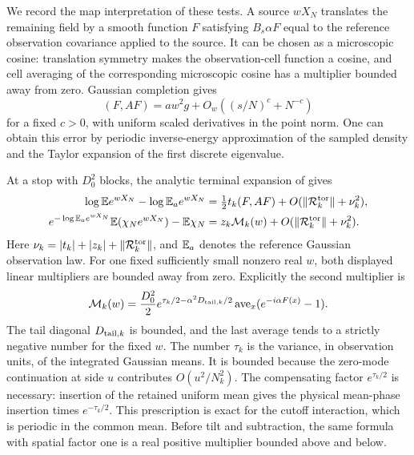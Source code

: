 We record the map interpretation of these tests.  A source $wX_N$
translates the remaining field by a smooth function $F$ satisfying
$B_s\alpha F$ equal to the reference observation covariance applied
to the source.  It can be chosen as a microscopic cosine: translation
symmetry makes the observation-cell function a cosine, and cell
averaging of the corresponding microscopic cosine has a multiplier
bounded away from zero.  Gaussian completion gives
\begin{equation}\label{eq:bulk-F-energy}
 (F,AF)=aw^2g+O_w((s/N)^c+N^{-c})
\end{equation}
for a fixed $c>0$, with uniform scaled derivatives in the point
norm.  One can obtain this error by periodic inverse-energy
approximation of the sampled density and the Taylor expansion of
the first discrete eigenvalue.

At a stop with $D_0^2$ blocks, the analytic terminal expansion of
\cite[Equations (10.3) and
(10.4)]{B} gives
\begin{align}
 \log\mathbb E e^{wX_N}-\log\mathbb E_a e^{wX_N}
 &=\tfrac12t_k(F,AF)
   +O(\lVert\mathcal R_k^{\rm tor}\rVert+\nu_k^2),
 \label{eq:bulk-map-gradient}\\
 e^{-\log\mathbb E_a e^{wX_N}}\mathbb E(\chi_Ne^{wX_N})-\mathbb E\chi_N
 &=z_k\mathcal M_k(w)
   +O(\lVert\mathcal R_k^{\rm tor}\rVert+\nu_k^2).
 \label{eq:bulk-map-phase}
\end{align}
Here $\nu_k=|t_k|+|z_k|+\lVert\mathcal R_k^{\rm tor}\rVert$,
and $\mathbb E_a$ denotes the reference Gaussian observation law.  For
one fixed sufficiently small nonzero real $w$, both displayed
linear multipliers are bounded away from zero.  Explicitly the
second multiplier is
\begin{equation}\label{eq:bulk-phase-multiplier}
 \mathcal M_k(w)=\frac{D_0^2}{2}
 e^{\tau_k/2-\alpha^2D_{{\rm tail},k}/2}
 \operatorname{ave}_x(e^{-i\alpha F(x)}-1).
\end{equation}
The tail diagonal $D_{{\rm tail},k}$ is bounded, and the last
average tends to a strictly negative number for the fixed $w$.
The number $\tau_k$ is the variance, in observation units, of
the integrated Gaussian means.  It is bounded because the
zero-mode continuation at side $u$ contributes $O(u^2/N_k^2)$.
The compensating factor $e^{\tau_k/2}$ is necessary: insertion
of the retained uniform mean gives the physical mean-phase
insertion times $e^{-\tau_k/2}$.  This prescription is exact for
the cutoff interaction, which is periodic in the common mean.
Before tilt and subtraction, the same formula with spatial
factor one is a real positive multiplier bounded above and below.

